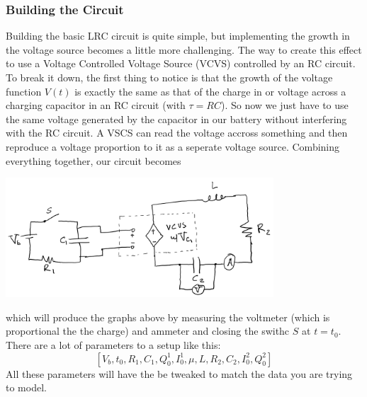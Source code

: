 \documentclass{report}
\begin{document}
            \subsubsection{Building the Circuit}
                Building the basic LRC circuit is quite simple, but implementing the growth in the voltage source becomes a little more challenging. The way to create this effect to use a Voltage Controlled Voltage Source (VCVS) controlled by an RC circuit.
                \newline\indent
                To break it down, the first thing to notice is that the growth of the voltage function $V(t)$ is exactly the same as that of the charge in or voltage across a charging capacitor in an RC circuit (with $\tau = RC$). So now we just have to use the same voltage generated by the capacitor in our battery without interfering with the RC circuit. A VSCS can read the voltage accross something and then reproduce a voltage proportion to it as a seperate voltage source. 
                \newline\indent
                Combining everything together, our circuit becomes
                \begin{center}
                    \includegraphics[width=10cm]{drawings/final_circuit.png}
                \end{center}
                which will produce the graphs above by measuring the voltmeter (which is proportional the the charge) and ammeter and closing the swithc $S$ at $t = t_0$. There are a lot of parameters to a setup like this:
                $$[V_b, t_0, R_1, C_1, Q^1_0, I^1_0, \mu, L, R_2, C_2, I^2_0, Q^2_0]$$ 
                All these parameters will have the be tweaked to match the data you are trying to model.
\end{document}
